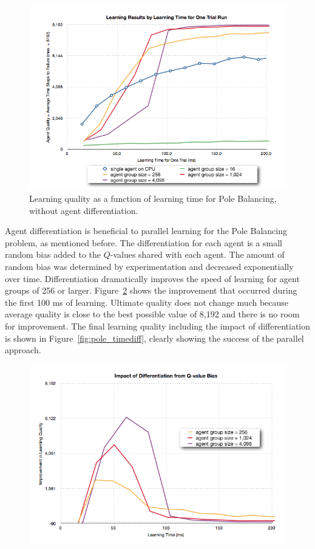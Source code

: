 \begin{figure}[hbtp]
\center
\includegraphics[scale=0.5]{fig08a}
\caption{Learning quality as a function of learning time for Pole Balancing, without agent differentiation.}
\label{fig:pole_time}
\end{figure}

\begin{flushleft}

Agent differentiation is beneficial to parallel learning for the Pole Balancing problem, as mentioned before.  The differentiation for each agent is a small random bias added to the $Q$-values shared with each agent. The amount of random bias was determined by experimentation and decreased exponentially over time.  Differentiation dramatically improves the speed of learning for agent groups of 256 or larger.  Figure~\ref{fig:pole_diff} shows the improvement that occurred during the first 100 ms of learning.  Ultimate quality does not change much because average quality is close to the best possible value of 8,192 and there is no room for improvement.  The final learning quality including the impact of differentiation is shown in Figure~\ref{fig:pole_timediff}, clearly showing the success of the parallel approach.

\end{flushleft}

\begin{figure}[hbtp]
\center
\includegraphics[scale=0.5]{fig09a}
\caption{}
\label{fig:pole_diff}
\end{figure}

